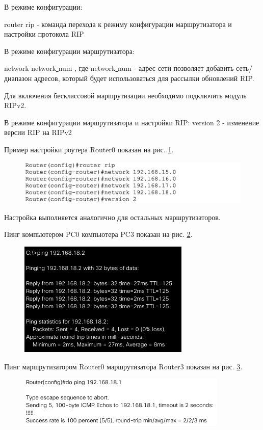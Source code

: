 \documentclass[a4paper,14pt]{extreport} %
\begin{document}
В режиме конфигурации:

router rip - команда перехода к режиму конфигурации маршрутизатора и настройки протокола RIP

В режиме конфигурации маршрутизатора:

network network\underline{ }num
, где network\underline{ }num - адрес сети
позволяет добавить сеть/диапазон адресов, который будет использоваться для рассылки обновлений RIP.

Для включения бесклассовой маршрутизации необходимо подключить модуль RIPv2.

В режиме конфигурации маршрутизатора и настройки RIP:
version 2 - изменение версии RIP на RIPv2

Пример настройки роутера Router0 показан на рис. \ref{fig:com}.

\begin{figure}[H]
	\centering
	\includegraphics[width=1\linewidth]{com}
	\caption{}
	\label{fig:com}
\end{figure}

Настройка выполняется аналогично для остальных маршрутизаторов.

Пинг компьютером PC0 компьютера PC3 показан на рис. \ref{fig:ping1}.

\begin{figure}[H]
	\centering
	\includegraphics[width=0.7\linewidth]{ping1}
	\caption{}
	\label{fig:ping1}
\end{figure}

Пинг маршрутизатором Router0 маршрутизатора Router3 показан на рис. \ref{fig:ping2}.

\begin{figure}[H]
	\centering
	\includegraphics[width=1\linewidth]{ping2}
	\caption{}
	\label{fig:ping2}
\end{figure}
\end{document}
